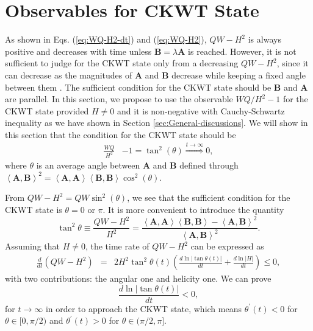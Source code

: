 \documentclass[english,aps,superscriptaddress,preprint]{revtex4-1}
\begin{document}
\section{Observables for CKWT State}

\label{sec:observables-CKWT}As shown in Eqs. (\ref{eq:WQ-H2-dt})
and (\ref{eq:WQ-H2}), $QW-H^{2}$ is always positive and decreases
with time unless $\boldsymbol{B}=\lambda\boldsymbol{A}$ is reached.
However, it is not sufficient to judge for the CKWT state only from
a decreasing $QW-H^{2}$, since it can decrease as the magnitudes
of $\boldsymbol{A}$ and $\boldsymbol{B}$ decrease while keeping
a fixed angle between them \citep{Chen2013}. The sufficient condition
for the CKWT state should be $\boldsymbol{B}$ and $\boldsymbol{A}$
are parallel. In this section, we propose to use the observable $WQ/H^{2}-1$
for the CKWT state provided $H\neq0$ and it is non-negative with
Cauchy-Schwartz inequality as we have shown in Section \ref{sec:General-discussions}.
We will show in this section that the condition for the CKWT state
should be 
\begin{align}
\frac{WQ}{H^{2}} & -1=\tan^{2}(\theta)\overset{t\rightarrow\infty}{\Longrightarrow}0,
\end{align}
where $\theta$ is an average angle between $\boldsymbol{A}$ and
$\boldsymbol{B}$ defined through $\left\langle \boldsymbol{A},\boldsymbol{B}\right\rangle ^{2}=\left\langle \boldsymbol{A},\boldsymbol{A}\right\rangle \left\langle \boldsymbol{B},\boldsymbol{B}\right\rangle \cos^{2}(\theta)$.

From $QW-H^{2}=QW\sin^{2}(\theta)$, we see that the sufficient condition
for the CKWT state is $\theta=0\text{ or }\pi$. It is more convenient
to introduce the quantity 
\begin{equation}
\tan^{2}\theta\equiv\frac{QW-H^{2}}{H^{2}}=\frac{\left\langle \boldsymbol{A},\boldsymbol{A}\right\rangle \left\langle \boldsymbol{B},\boldsymbol{B}\right\rangle -\left\langle \boldsymbol{A},\boldsymbol{B}\right\rangle ^{2}}{\left\langle \boldsymbol{A},\boldsymbol{B}\right\rangle ^{2}}.
\end{equation}
Assuming that $H\neq0$, the time rate of $QW-H^{2}$ can be expressed
as 
\begin{eqnarray}
\frac{d}{dt}(QW-H^{2}) & = & 2H^{2}\tan^{2}\theta(t)\left(\frac{d\ln|\tan\theta(t)|}{dt}+\frac{d\ln|H|}{dt}\right)\leq0,
\end{eqnarray}
with two contributions: the angular one and helicity one. We can prove
\begin{equation}
\frac{d\ln|\tan\theta(t)|}{dt}<0,\label{eq:angle-rate}
\end{equation}
for $t\rightarrow\infty$ in order to approach the CKWT state, which
means $\theta^{\prime}(t)<0$ for $\theta\in[0,\pi/2)$ and $\theta^{\prime}(t)>0$
for $\theta\in(\pi/2,\pi]$.
\end{document}
